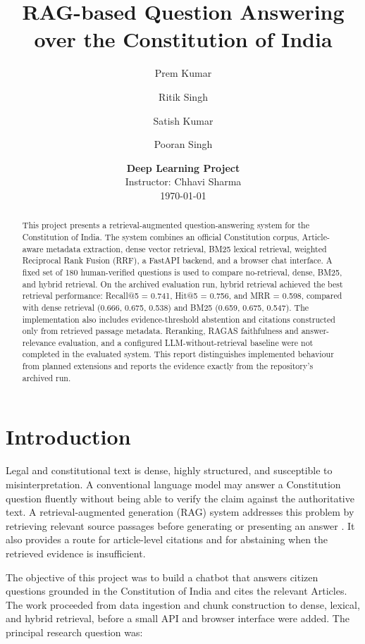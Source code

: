 \documentclass[11pt]{article}
\title{\textbf{RAG-based Question Answering over the Constitution of India}}
\author{
Prem Kumar \and Ritik Singh \and Satish Kumar \and Pooran Singh
}
\date{\textbf{Deep Learning Project}\\Instructor: Chhavi Sharma\\[0.5em]\today}
\begin{document}
\maketitle

\begin{abstract}
This project presents a retrieval-augmented question-answering system for the Constitution of India. The system combines an official Constitution corpus, Article-aware metadata extraction, dense vector retrieval, BM25 lexical retrieval, weighted Reciprocal Rank Fusion (RRF), a FastAPI backend, and a browser chat interface. A fixed set of 180 human-verified questions is used to compare no-retrieval, dense, BM25, and hybrid retrieval. On the archived evaluation run, hybrid retrieval achieved the best retrieval performance: Recall@5 = 0.741, Hit@5 = 0.756, and MRR = 0.598, compared with dense retrieval (0.666, 0.675, 0.538) and BM25 (0.659, 0.675, 0.547). The implementation also includes evidence-threshold abstention and citations constructed only from retrieved passage metadata. Reranking, RAGAS faithfulness and answer-relevance evaluation, and a configured LLM-without-retrieval baseline were not completed in the evaluated system. This report distinguishes implemented behaviour from planned extensions and reports the evidence exactly from the repository's archived run.
\end{abstract}

\section{Introduction}

Legal and constitutional text is dense, highly structured, and susceptible to misinterpretation. A conventional language model may answer a Constitution question fluently without being able to verify the claim against the authoritative text. A retrieval-augmented generation (RAG) system addresses this problem by retrieving relevant source passages before generating or presenting an answer \cite{Lewis2020}. It also provides a route for article-level citations and for abstaining when the retrieved evidence is insufficient.

The objective of this project was to build a chatbot that answers citizen questions grounded in the Constitution of India and cites the relevant Articles. The work proceeded from data ingestion and chunk construction to dense, lexical, and hybrid retrieval, before a small API and browser interface were added. The principal research question was:
\end{document}
